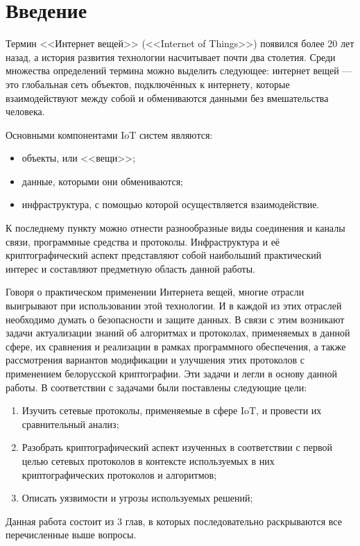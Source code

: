 \chapter*{Введение}
 
 	Термин <<Интернет вещей>> (<<Internet of Things>>) появился более 20 лет назад, а история развития
 	технологии насчитывает почти два столетия. Среди множества определений термина можно выделить
 	следующее: интернет вещей --- это глобальная сеть объектов, подключённых к интернету, которые 
 	взаимодействуют между собой и обмениваются данными без вмешательства человека.
 	
 	Основными компонентами IoT систем являются:
 	\begin{itemize}
 		\item объекты, или <<вещи>>;
 		\item данные, которыми они обмениваются;
 		\item инфраструктура, с помощью которой осуществляется взаимодействие.
 	\end{itemize}
 
 	К последнему пункту можно отнести разнообразные виды соединения и каналы связи, программные 
 	средства и протоколы. Инфраструктура и её криптографический аспект представляют собой наибольший
 	практический интерес и составляют предметную область данной работы.
 	
 	Говоря о практическом применении Интернета вещей, многие отрасли выигрывают при использовании
 	этой технологии. И в каждой из этих отраслей необходимо думать о безопасности и защите данных.
 	В связи с этим возникают задачи актуализации знаний об алгоритмах и протоколах, применяемых в
 	данной сфере, их сравнения и реализации в рамках программного обеспечения, а также рассмотрения
 	вариантов модификации и улучшения этих протоколов с применением белорусской криптографии. Эти
 	задачи и легли в основу данной работы. В соответствии с задачами были поставлены следующие цели:
 	
 	\begin{enumerate}
 		\item Изучить сетевые протоколы, применяемые в сфере IoT, и провести их сравнительный анализ;
 		\item Разобрать криптографический аспект изученных в соответствии с первой целью сетевых 
 		протоколов в контексте используемых в них криптографических протоколов и алгоритмов;
 		\item Описать уязвимости и угрозы используемых решений;
 	\end{enumerate}
 	
 	Данная работа состоит из 3 глав, в которых последовательно раскрываются все перечисленные выше
 	вопросы.